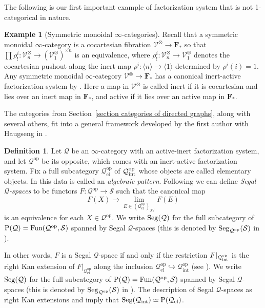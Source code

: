\documentclass{amsart}
\numberwithin{theorem}{subsection}
\theoremstyle{definition}
\newtheorem{definition}[theorem]{Definition}
\newtheorem{example}[theorem]{Example}
\providecommand{\op}{\mathrm{op}}
\providecommand{\xel}{\mathrm{el}}
\providecommand{\xint}{\mathrm{int}}
\newcommand{\xFun}{\operatorname{Fun}}
\newcommand{\finsetskel}{\mathbf{F}}
\newcommand{\pfinsetskel}{\finsetskel_*}
\newcommand{\xS}{\mathcal{S}}
\newcommand{\xV}{\mathcal{V}}
\newcommand{\Pre}{\name{P}}
\newcommand{\icat}{$\infty$-category}
\newcommand{\name}[1]{\ensuremath{\text{\textup{#1}}}}
\newcommand{\Seg}{\name{Seg}}
\begin{document}
The following is our first important example of factorization system that is not 1-categorical in nature.

\begin{example}[Symmetric monoidal $\infty$-categories]\label{example fact system smc}
Recall that a symmetric monoidal \icat{} is a cocartesian fibration $\xV^\otimes \to \pfinsetskel$ so that $\prod \rho^i_! \colon \xV^{\otimes}_n \to (\xV^{\otimes}_1)^{\times n}$ is an equivalence, where $\rho^i_!\colon \xV^\otimes_n\to \xV^\otimes_1$ denotes the cocartesian pushout along the inert map $\rho^i\colon \langle n\rangle \to \langle 1\rangle$ determined by $\rho^i(i)=1$.
Any symmetric monoidal $\infty$-category $\xV^{\otimes} \to \pfinsetskel$ has a canonical inert-active factorization system by \cite[Proposition 2.1.2.4]{ha}. 
Here a map in $\xV^\otimes$ is called inert if it is cocartesian and lies over an inert map in $\pfinsetskel$, and active if it lies over an active map in $\pfinsetskel$. 
\end{example}

The categories from Section~\ref{section categories of directed graphs}, along with several others, fit into a general framework developed by the first author with Haugseng in \cite{patterns1}.

\begin{definition}\label{def algpatt}
Let $\mathcal Q$ be an $\infty$-category with an active-inert factorization system, and let $\mathcal Q^\op$ be its opposite, which comes with an inert-active factorization system.
Fix a full subcategory $\mathcal Q^\op_\xel$ of $\mathcal Q^\op_{\name{int}}$ whose objects are called elementary objects. 
In \cite[Definition 2.1]{patterns1} this data is called an \emph{algebraic pattern}.
Following \cite[Definition 2.7]{patterns1} we can define \emph{Segal $\mathcal{Q}$-spaces} to be functors $F\colon \mathcal Q^\op \to \xS$ such that the canonical map 
	\[F(X)\to \lim_{E\in (\mathcal Q^{\op}_{\xel})_{X/}}	F(E)\]
	is an equivalence for each $X\in \mathcal Q^\op$. 
We write $\Seg(\mathcal Q)$ for the full subcategory of $\Pre(\mathcal Q) = \xFun(\mathcal Q^\op, \xS)$ spanned by Segal $\mathcal Q$-spaces (this is denoted by $\Seg_{\mathcal{Q}^\op}(\xS)$ in \cite{patterns1}).
\end{definition}

	In other words, $F$ is a Segal $\mathcal Q$-space if and only if the restriction $F|_{\mathcal Q^\op_{\name{int}}}$ is the right Kan extension of $F|_{\mathcal Q^\op_\xel}$ along the inclusion $\mathcal Q^{\op}_{\xel}\hookrightarrow \mathcal Q^{\op}_{\xint}$ (see \cite[Lemma 2.9]{patterns1}). 
	We write $\Seg(\mathcal Q)$ for the full subcategory of $\Pre(\mathcal Q) = \xFun(\mathcal Q^\op, \xS)$ spanned by Segal $\mathcal Q$-spaces (this is denoted by $\Seg_{\mathcal{Q}^\op}(\xS)$ in \cite{patterns1}).
	The description of Segal $\mathcal Q$-spaces as right Kan extensions and \cite[Proposition 4.3.2.15]{ht} imply that $\Seg(\mathcal Q_{\xint})\simeq \Pre(\mathcal Q_{\xel})$.
	
\end{document}

